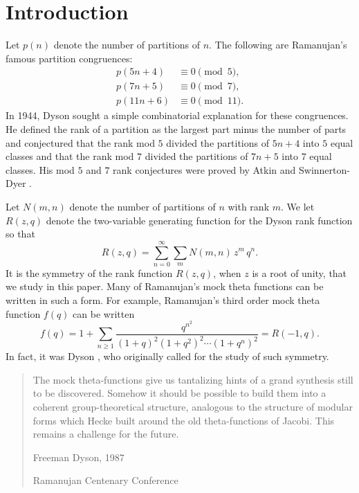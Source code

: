 \documentclass[12pt]{amsart}
\theoremstyle{definition}
\theoremstyle{remark}
\numberwithin{equation}{section}
\newcommand\mylabel[1]{\label{#1}}
\begin{document}
\maketitle
\section{Introduction}
\mylabel{sec:intro}

Let $p(n)$ denote the number of partitions of $n$. The following are
Ramanujan's famous partition congruences:
\begin{align*}
p(5n+4) &\equiv 0 \pmod{5},\\
p(7n+5) &\equiv 0 \pmod{7},\\
p(11n+6) &\equiv 0 \pmod{11}.
\end{align*}
In 1944, Dyson \cite{Dy44} sought a simple combinatorial explanation for
these congruences. He defined the rank of a partition as the largest part minus 
the number of parts and conjectured that the rank mod $5$ divided the partitions 
of $5n+4$ into $5$ equal classes and that the rank mod $7$ divided the partitions of 
$7n+5$ into $7$ equal classes. His mod $5$ and $7$ rank conjectures
were proved by Atkin and Swinnerton-Dyer \cite{At-Sw}. 

Let $N(m,n)$ denote the number of partitions of $n$ with rank $m$. We let 
$R(z,q)$ denote the two-variable generating function for the Dyson rank function 
so that
$$
R(z,q) = \sum_{n=0}^\infty \sum_m N(m,n)\,z^m\,q^n.
$$
It is the symmetry of the rank function $R(z,q)$, when $z$
is a root of unity,  that we study in this paper. Many of Ramanujan's mock theta
functions can be written in such a form. For example,
Ramanujan's third order mock theta function $f(q)$ can be written
$$                        
f(q) = 1 + \sum_{n\ge1} \frac{q^{n^2}}{(1+q)^2(1+q^2)^2 \cdots (1+q^n)^2} = R(-1,q).
$$
In fact, it was Dyson \cite[p.20]{Dy1988}, %
who originally called for the study of such symmetry.

\begin{quote}
The mock theta-functions give us tantalizing hints of a grand synthesis
still to be discovered. Somehow it should be possible to build them
into a coherent group-theoretical structure, analogous to the structure
of modular forms which Hecke built around the old theta-functions of
Jacobi. This remains a challenge for the future.

\smallskip

\hskip2in Freeman Dyson, 1987

\hskip2in Ramanujan Centenary Conference\\
\end{quote}
\end{document}
